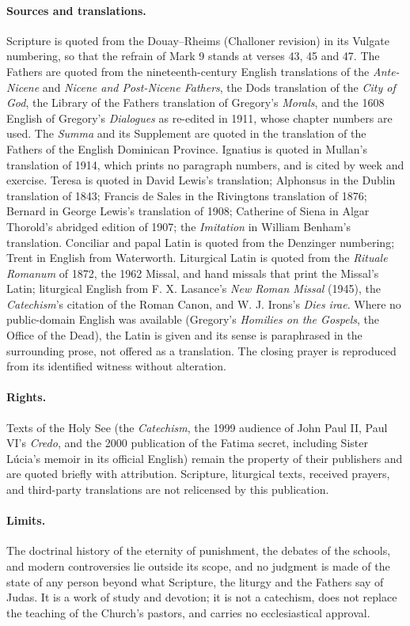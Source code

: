 \paragraph{Sources and translations.} Scripture is quoted from the Douay--Rheims (Challoner revision) in its Vulgate numbering, so that the refrain of Mark 9 stands at verses 43, 45 and 47. The Fathers are quoted from the nineteenth-century English translations of the \emph{Ante-Nicene} and \emph{Nicene and Post-Nicene Fathers}, the Dods translation of the \emph{City of God}, the Library of the Fathers translation of Gregory's \emph{Morals}, and the 1608 English of Gregory's \emph{Dialogues} as re-edited in 1911, whose chapter numbers are used. The \emph{Summa} and its Supplement are quoted in the translation of the Fathers of the English Dominican Province. Ignatius is quoted in Mullan's translation of 1914, which prints no paragraph numbers, and is cited by week and exercise. Teresa is quoted in David Lewis's translation; Alphonsus in the Dublin translation of 1843; Francis de Sales in the Rivingtons translation of 1876; Bernard in George Lewis's translation of 1908; Catherine of Siena in Algar Thorold's abridged edition of 1907; the \emph{Imitation} in William Benham's translation. Conciliar and papal Latin is quoted from the Denzinger numbering; Trent in English from Waterworth. Liturgical Latin is quoted from the \emph{Rituale Romanum} of 1872, the 1962 Missal, and hand missals that print the Missal's Latin; liturgical English from F. X. Lasance's \emph{New Roman Missal} (1945), the \emph{Catechism}'s citation of the Roman Canon, and W. J. Irons's \emph{Dies irae}. Where no public-domain English was available (Gregory's \emph{Homilies on the Gospels}, the Office of the Dead), the Latin is given and its sense is paraphrased in the surrounding prose, not offered as a translation. The closing prayer is reproduced from its identified witness without alteration.

\paragraph{Rights.} Texts of the Holy See (the \emph{Catechism}, the 1999 audience of John Paul II, Paul VI's \emph{Credo}, and the 2000 publication of the Fatima secret, including Sister Lúcia's memoir in its official English) remain the property of their publishers and are quoted briefly with attribution. Scripture, liturgical texts, received prayers, and third-party translations are not relicensed by this publication.

\paragraph{Limits.} The doctrinal history of the eternity of punishment, the debates of the schools, and modern controversies lie outside its scope, and no judgment is made of the state of any person beyond what Scripture, the liturgy and the Fathers say of Judas. It is a work of study and devotion; it is not a catechism, does not replace the teaching of the Church's pastors, and carries no ecclesiastical approval.

